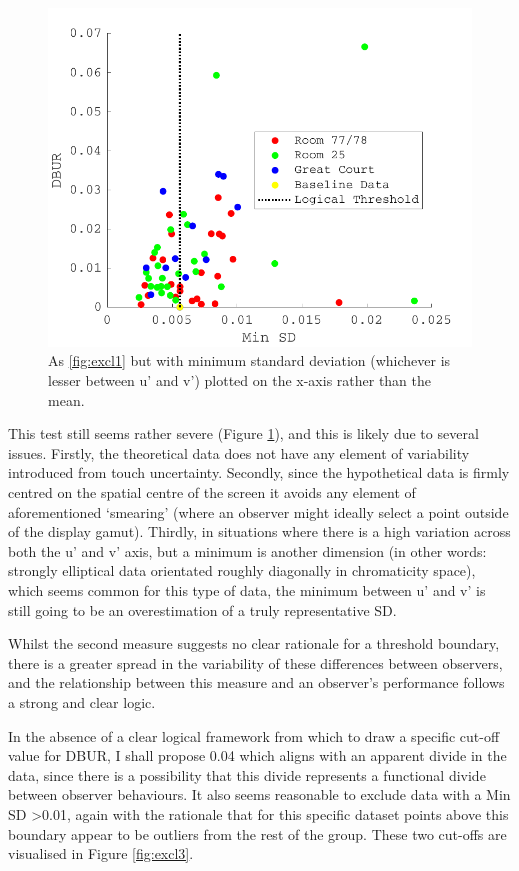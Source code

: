 \begin{figure}[hbtp] 
\includegraphics[max width=\textwidth]{figs/tablet/excl2.pdf} 
\caption{As \ref{fig:excl1} but with minimum standard deviation (whichever is lesser between u' and v') plotted on the x-axis rather than the mean.}
\label{fig:excl2}
\end{figure}

This test still seems rather severe (Figure \ref{fig:excl2}), and this is likely due to several issues. Firstly, the theoretical data does not have any element of variability introduced from touch uncertainty. Secondly, since the hypothetical data is firmly centred on the spatial centre of the screen it avoids any element of aforementioned `smearing' (where an observer might ideally select a point outside of the display gamut). Thirdly, in situations where there is a high variation across both the u' and v' axis, but a minimum is another dimension (in other words: strongly elliptical data orientated roughly diagonally in chromaticity space), which seems common for this type of data, the minimum between u' and v' is still going to be an overestimation of a truly representative SD.

Whilst the second measure suggests no clear rationale for a threshold boundary, there is a greater spread in the variability of these differences between observers, and the relationship between this measure and an observer's performance follows a strong and clear logic.

In the absence of a clear logical framework from which to draw a specific cut-off value for DBUR, I shall propose 0.04 which aligns with an apparent divide in the data, since there is a possibility that this divide represents a functional divide between observer behaviours. It also seems reasonable to exclude data with a Min SD \textgreater 0.01, again with the rationale that for this specific dataset points above this boundary appear to be outliers from the rest of the group. These two cut-offs are visualised in Figure \ref{fig:excl3}.

